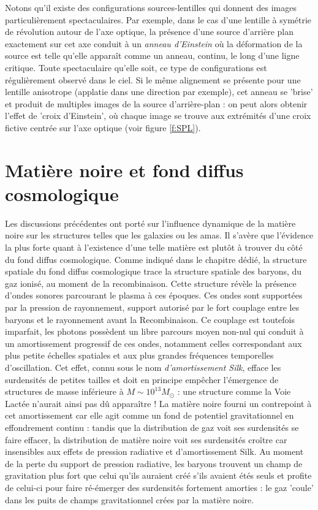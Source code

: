 Notons qu'il existe des configurations sources-lentilles qui donnent des images particulièrement spectaculaires. Par exemple, dans le cas d'une lentille à symétrie de révolution autour de l'axe optique, la présence d'une source d'arrière plan exactement sur cet axe conduit à un \textit{anneau d'Einstein} où la déformation de la source est telle qu'elle apparaît comme un anneau, continu, le long d'une ligne critique. Toute spectaculaire qu'elle soit, ce type de configurations est régulièrement observé dans le ciel. Si le même alignement se présente pour une lentille anisotrope (applatie dans une direction par exemple), cet anneau se 'brise' et produit de multiples images de la source d'arrière-plan : on peut alors obtenir l'effet de 'croix d'Einstein', où chaque image se trouve aux extrémités d'une croix fictive centrée sur l'axe optique (voir figure \ref{f:SPL}).


\section{Matière noire et fond diffus cosmologique}

Les discussions précédentes ont porté sur l'influence dynamique de la matière noire sur les structures telles que les galaxies ou les amas. Il s'avère que l'évidence la plus forte quant à l'existence d'une telle matière est plutôt à trouver du côté du fond diffus cosmologique. Comme indiqué dans le chapitre dédié, la structure spatiale du fond diffus cosmologique trace la structure spatiale des baryons, du gaz ionisé, au moment de la recombinaison. Cette structure révèle la présence d'ondes sonores parcourant le plasma à ces époques. Ces ondes sont supportées par la pression de rayonnement, support autorisé par le fort couplage entre les baryons et le rayonnement avant la Recombinaison. Ce couplage est toutefois imparfait, les photons possèdent un libre parcours moyen non-nul qui conduit à un amortissement progressif de ces ondes, notamment celles correspondant aux plus petite échelles spatiales et aux plus grandes fréquences temporelles d'oscillation. Cet effet, connu sous le nom \textit{d'amortissement Silk},  efface les surdensités de petites tailles et doit en principe empêcher l'émergence de structures de masse inférieure à $M\sim 10^{13} M_\odot$ : une structure comme la Voie Lactée n'aurait ainsi pas dû apparaître ! La matière noire fourni un contrepoint à cet amortissement car elle agit comme un fond de potentiel gravitationnel en effondrement continu : tandis que la distribution de gaz voit ses surdensités se faire effacer, la distribution de matière noire voit ses surdensités croître car insensibles aux effets de pression radiative et d'amortissement Silk. Au moment de la perte du support de pression radiative, les baryons trouvent un champ de gravitation plus fort que celui qu'ils auraient créé s'ils avaient étés seuls et profite de celui-ci pour faire ré-émerger des surdensités fortement amorties : le gaz 'coule' dans les puits de champs gravitationnel crées par la matière noire. 

